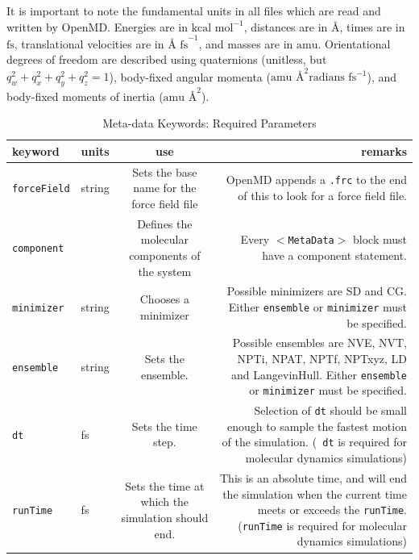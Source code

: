\documentclass[]{book}
\begin{document}
It is important to note the fundamental units in all files which are
read and written by {\sc OpenMD}.  Energies are in $\mbox{kcal
mol}^{-1}$, distances are in $\mbox{\AA}$, times are in $\mbox{fs}$,
translational velocities are in $\mbox{\AA~fs}^{-1}$, and masses are
in $\mbox{amu}$.  Orientational degrees of freedom are described using
quaternions (unitless, but $q_w^2 + q_x^2 + q_y^2 + q_z^2 = 1$),
body-fixed angular momenta ($\mbox{amu \AA}^{2} \mbox{radians
fs}^{-1}$), and body-fixed moments of inertia ($\mbox{amu \AA}^{2}$). 

\begin{longtable}[c]{ABCD}
\caption{Meta-data Keywords: Required Parameters}
\\
{\bf keyword} & {\bf units} & {\bf use} & {\bf remarks}  \\ \hline
\endhead
\hline
\endfoot
{\tt forceField} & string & Sets the base name for the force field file &
OpenMD appends a {\tt .frc} to the end of this to look for a force
field file.\\
{\tt component} & & Defines the molecular components of the system &
Every {\tt $<$MetaData$>$} block must have a component statement. \\
{\tt minimizer} & string & Chooses a minimizer & Possible minimizers
are SD and CG. Either {\tt ensemble} or {\tt minimizer} must be specified. \\
{\tt ensemble} & string & Sets the ensemble. & Possible ensembles are
NVE, NVT, NPTi, NPAT, NPTf, NPTxyz, LD and LangevinHull.  Either {\tt ensemble}
or {\tt minimizer} must be specified. \\
{\tt dt} & fs & Sets the time step. & Selection of {\tt dt} should be
small enough to sample the fastest motion of the simulation. ({\tt
dt} is required for molecular dynamics simulations)\\
{\tt runTime} & fs & Sets the time at which the simulation should
end. & This is an absolute time, and will end the simulation when the
current time meets or exceeds the {\tt runTime}. ({\tt runTime} is
required for molecular dynamics simulations)
\label{table:reqParams}
\end{longtable}
\end{document}

